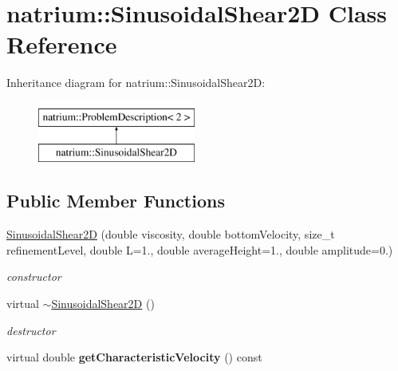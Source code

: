 \hypertarget{classnatrium_1_1SinusoidalShear2D}{\section{natrium\-:\-:Sinusoidal\-Shear2\-D Class Reference}
\label{classnatrium_1_1SinusoidalShear2D}
}
Inheritance diagram for natrium\-:\-:Sinusoidal\-Shear2\-D\-:\begin{figure}[H]
\begin{center}
\leavevmode
\includegraphics[height=2.000000cm]{classnatrium_1_1SinusoidalShear2D}
\end{center}
\end{figure}
\subsection*{Public Member Functions}
\begin{DoxyCompactItemize}
\item 
\hypertarget{classnatrium_1_1SinusoidalShear2D_a82b024dafe2d634da6835bac3e85f8d0}{\hyperlink{classnatrium_1_1SinusoidalShear2D_a82b024dafe2d634da6835bac3e85f8d0}{Sinusoidal\-Shear2\-D} (double viscosity, double bottom\-Velocity, size\-\_\-t refinement\-Level, double L=1., double average\-Height=1., double amplitude=0.)}\label{classnatrium_1_1SinusoidalShear2D_a82b024dafe2d634da6835bac3e85f8d0}

\begin{DoxyCompactList}\small\item\em constructor \end{DoxyCompactList}\item 
\hypertarget{classnatrium_1_1SinusoidalShear2D_a7aaf185e32e29f1f50b3f9db9c213a2c}{virtual \hyperlink{classnatrium_1_1SinusoidalShear2D_a7aaf185e32e29f1f50b3f9db9c213a2c}{$\sim$\-Sinusoidal\-Shear2\-D} ()}\label{classnatrium_1_1SinusoidalShear2D_a7aaf185e32e29f1f50b3f9db9c213a2c}

\begin{DoxyCompactList}\small\item\em destructor \end{DoxyCompactList}\item 
\hypertarget{classnatrium_1_1SinusoidalShear2D_af1162ca66457ddfa460f379f1544a5f5}{virtual double {\bfseries get\-Characteristic\-Velocity} () const }\label{classnatrium_1_1SinusoidalShear2D_af1162ca66457ddfa460f379f1544a5f5}

\end{DoxyCompactItemize}


